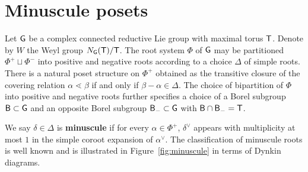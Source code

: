 \documentclass[12pt]{amsart}
\theoremstyle{definition}
\theoremstyle{remark}
\numberwithin{equation}{section}
\begin{document}
\section{Minuscule posets}\label{sec:minuscule}

Let ${\sf G}$ be a complex connected reductive Lie group with maximal torus ${\sf T}$. Denote by $W$ the Weyl group $N_{\sf G}({\sf T})/{\sf T}$. The root system $\Phi$ of ${\sf G}$ may be partitioned $\Phi^+ \sqcup \Phi^-$ into positive and negative roots according to a choice $\Delta$ of simple roots. There is a natural poset structure on $\Phi^+$ obtained as the transitive closure of the covering relation $\alpha \lessdot \beta$ if and only if $\beta - \alpha \in \Delta$. The choice of bipartition of $\Phi$ into positive and negative roots further specifies a choice of a Borel subgroup ${\sf B} \subset {\sf G}$ and an opposite Borel subgroup ${\sf B}_- \subset {\sf G}$ with ${\sf B} \cap {\sf B}_- = {\sf T}$.

We say $\delta \in \Delta$ is {\bf minuscule} if for every $\alpha \in \Phi^+$, $\delta^\vee$ appears with multiplicity at most $1$ in the simple coroot expansion of $\alpha^\vee$. The classification of minuscule roots is well known and is illustrated in Figure~\ref{fig:minuscule} in terms of Dynkin diagrams.
\end{document}
